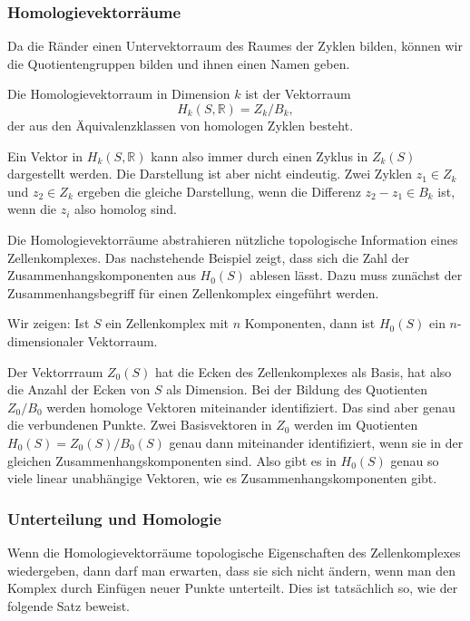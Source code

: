 \subsubsection{Homologievektorräume}
Da die Ränder einen Untervektorraum des Raumes der Zyklen bilden,
können wir die Quotientengruppen bilden und ihnen einen Namen geben.

\begin{definition}[Homologievektorraum]
Die Homologievektorraum in Dimension $k$ ist der Vektorraum
\[
H_k(S,\mathbb{R})
=
Z_k / B_k,
\]
%
der aus den Äquivalenzklassen von homologen Zyklen besteht.
\end{definition}

Ein Vektor in $H_k(S,\mathbb{R})$ kann also immer durch einen Zyklus
in $Z_k(S)$ dargestellt werden.
Die Darstellung ist aber nicht eindeutig.
Zwei Zyklen $z_1\in Z_k$ und $z_2\in Z_k$ ergeben die gleiche Darstellung,
wenn die Differenz $z_2-z_1\in B_k$ ist, wenn die $z_i$ also homolog sind.

Die Homologievektorräume abstrahieren nützliche topologische Information
eines Zellenkomplexes.
Das nachstehende Beispiel zeigt, dass sich die Zahl der
Zusammenhangskomponenten aus $H_0(S)$ ablesen lässt.
Dazu muss zunächst der Zusammenhangsbegriff für einen Zellenkomplex
eingeführt werden.

\begin{beispiel}
Wir zeigen: Ist $S$ ein Zellenkomplex mit $n$ Komponenten, dann ist 
$H_0(S)$ ein $n$-dimensionaler Vektorraum.
\medskip

Der Vektorrraum $Z_0(S)$ hat die Ecken des Zellenkomplexes als Basis,
hat also die Anzahl der Ecken von $S$ als Dimension.
Bei der Bildung des Quotienten $Z_0/B_0$ werden homologe Vektoren miteinander
identifiziert.
Das sind aber genau die verbundenen Punkte.
Zwei Basisvektoren in $Z_0$ werden im Quotienten $H_0(S)=Z_0(S)/B_0(S)$
genau dann miteinander identifiziert, wenn sie in der gleichen
Zusammenhangskomponenten sind.
Also gibt es in $H_0(S)$ genau so viele linear unabhängige Vektoren,
wie es Zusammenhangskomponenten gibt.
\end{beispiel}

%
%
\subsubsection{Unterteilung und Homologie}
Wenn die Homologievektorräume topologische Eigenschaften des Zellenkomplexes
wiedergeben, dann darf man erwarten, dass sie sich nicht
ändern, wenn man den Komplex durch Einfügen neuer Punkte unterteilt.
Dies ist tatsächlich so, wie der folgende Satz beweist.

